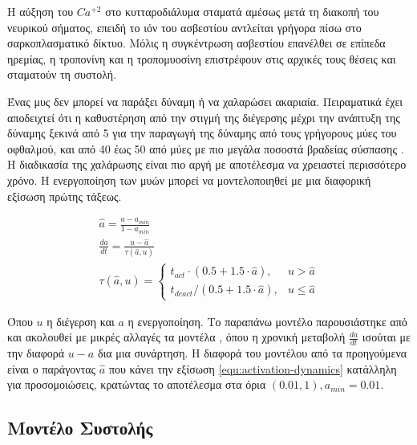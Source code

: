 Η αύξηση του $Ca^{+2}$ στο κυτταροδιάλυμα σταματά αμέσως μετά τη διακοπή του νευρικού σήματος, επειδή το ιόν του ασβεστίου αντλείται γρήγορα πίσω στο σαρκοπλασματικό δίκτυο. Μόλις η συγκέντρωση ασβεστίου επανέλθει σε επίπεδα ηρεμίας, η τροπονίνη και η τροπομυοσίνη επιστρέφουν στις αρχικές τους θέσεις και σταματούν τη συστολή.

Ένας μυς δεν μπορεί να παράξει δύναμη ή να χαλαρώσει ακαριαία. Πειραματικά έχει αποδειχτεί ότι η καθυστέρηση από την στιγμή της διέγερσης μέχρι την ανάπτυξη της δύναμης ξεκινά από 5 για την παραγωγή της δύναμης από τους γρήγορους μύες του οφθαλμού, και από 40 έως 50 από μύες με πιο μεγάλα ποσοστά βραδείας σύσπασης \cite{zajac89}. Η διαδικασία της χαλάρωσης είναι πιο αργή με αποτέλεσμα να χρειαστεί περισσότερο χρόνο. Η ενεργοποίηση των μυών μπορεί να μοντελοποιηθεί με μια διαφορική εξίσωση πρώτης τάξεως.

\begin{equation}
    \begin{gathered}
        \hat{a} = \frac{a - a_{min}}{1 - a_{min}}\\[10pt]
        \frac{da}{dt} = \frac{u - \hat{a}}{\tau (\hat{a}, u)}\\[10pt]
        \tau (\hat{a}, u) =
        \begin{cases}
            t_{act} \cdot (0.5 +1.5 \cdot \hat{a}), & u > \hat{a} \\
            t_{deact}/(0.5 +1.5 \cdot \hat{a}), & u \leq \hat{a}
        \end{cases}
    \end{gathered}
    \label{equ:activation-dynamics}
\end{equation}

Όπου $u$ η διέγερση και $a$ η ενεργοποίηση. Το παραπάνω μοντέλο παρουσιάστηκε από \cite{millard13} και ακολουθεί με μικρές αλλαγές τα μοντέλα \cite{thelen03, winters95}, όπου η χρονική μεταβολή $\frac{da}{dt}$ ισούται με την διαφορά $u - a$ δια μια συνάρτηση. Η διαφορά του μοντέλου από τα προηγούμενα είναι ο παράγοντας $\hat{a}$ που κάνει την εξίσωση \ref{equ:activation-dynamics} κατάλληλη για προσομοιώσεις, κρατώντας το αποτέλεσμα στα όρια $(0.01, 1), a_{min} = 0.01$.

\subsection{Μοντέλο Συστολής}


